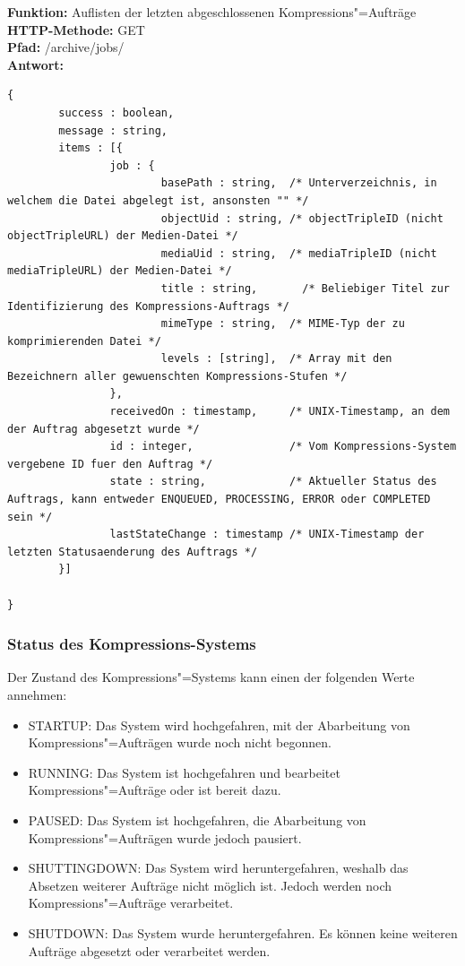 \noindent\textbf{Funktion: }Auflisten der letzten abgeschlossenen Kompressions"=Aufträge\\
\textbf{HTTP-Methode: } {\ttfamily GET} \\
\textbf{Pfad: } {\ttfamily /archive/jobs/} \\
\textbf{Antwort: }
\begin{lstlisting}[caption={Antwort auf das Auflisten abgeschlossener Kompressions-Aufträge}]
{
		success : boolean,
		message : string,
		items : [{
				job : {
						basePath : string, 	/* Unterverzeichnis, in welchem die Datei abgelegt ist, ansonsten "" */
						objectUid : string, /* objectTripleID (nicht objectTripleURL) der Medien-Datei */
						mediaUid : string, 	/* mediaTripleID (nicht mediaTripleURL) der Medien-Datei */
						title : string, 	  /* Beliebiger Titel zur Identifizierung des Kompressions-Auftrags */
						mimeType : string, 	/* MIME-Typ der zu komprimierenden Datei */
						levels : [string], 	/* Array mit den Bezeichnern aller gewuenschten Kompressions-Stufen */
				},
				receivedOn : timestamp,     /* UNIX-Timestamp, an dem der Auftrag abgesetzt wurde */
				id : integer,               /* Vom Kompressions-System vergebene ID fuer den Auftrag */
				state : string,             /* Aktueller Status des Auftrags, kann entweder ENQUEUED, PROCESSING, ERROR oder COMPLETED sein */
				lastStateChange : timestamp /* UNIX-Timestamp der letzten Statusaenderung des Auftrags */
		}]
		
}
\end{lstlisting}

\subsubsection{Status des Kompressions-Systems}

Der Zustand des Kompressions"=Systems kann einen der folgenden Werte annehmen:
\begin{itemize}
\item {\ttfamily STARTUP:} Das System wird hochgefahren, mit der Abarbeitung von Kompressions"=Aufträgen wurde noch nicht begonnen.
\item {\ttfamily RUNNING:} Das System ist hochgefahren und bearbeitet Kompressions"=Aufträge oder ist bereit dazu.
\item {\ttfamily PAUSED:} Das System ist hochgefahren, die Abarbeitung von Kompressions"=Aufträgen wurde jedoch pausiert.
\item {\ttfamily SHUTTINGDOWN:} Das System wird heruntergefahren, weshalb das Absetzen weiterer Aufträge nicht möglich ist. Jedoch werden noch Kompressions"=Aufträge verarbeitet.
\item {\ttfamily SHUTDOWN:} Das System wurde heruntergefahren. Es können keine weiteren Aufträge abgesetzt oder verarbeitet werden.
\end{itemize}

